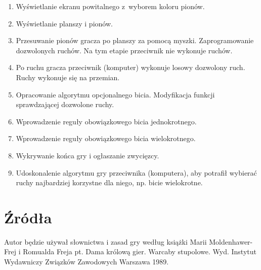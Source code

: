 \documentclass[12pt,twoside,a4paper]{article}
\begin{document}
\begin{enumerate}
   \item Wyświetlanie ekranu powitalnego z~wyborem koloru pionów.
	\item Wyświetlanie planszy i pionów.
	\item Przesuwanie pionów gracza po planszy za pomocą myszki. Zaprogramowanie dozwolonych ruchów. Na tym etapie przeciwnik nie wykonuje ruchów.
   \item Po ruchu gracza przeciwnik (komputer) wykonuje losowy dozwolony ruch. Ruchy wykonuje się na przemian.
   \item Opracowanie algorytmu opcjonalnego bicia. Modyfikacja funkcji sprawdzającej dozwolone ruchy.
   \item Wprowadzenie reguły obowiązkowego bicia jednokrotnego.
   \item Wprowadzenie reguły obowiązkowego bicia wielokrotnego.
   \item Wykrywanie końca gry i ogłaszanie zwycięzcy.
   \item Udoskonalenie algorytmu gry przeciwnika (komputera), aby potrafił wybierać ruchy najbardziej korzystne dla niego, np. bicie wielokrotne.
\end{enumerate}

\section{Źródła}

Autor będzie używał słownictwa i zasad gry według książki Marii Moldenhawer-Frej i Romualda Freja pt. Dama królową gier. Warcaby stupolowe. Wyd. Instytut Wydawniczy Związków Zawodowych Warszawa 1989.
\end{document}
